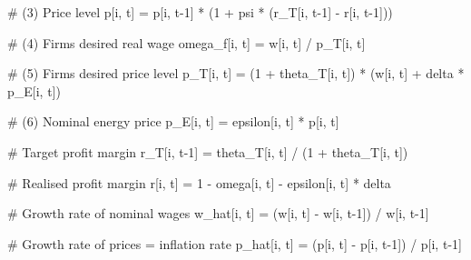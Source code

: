 \documentclass[
  letterpaper,
  DIV=11,
  numbers=noendperiod]{scrreprt}
\newenvironment{Shaded}{\begin{snugshade}}{\end{snugshade}}
\newcommand{\CommentTok}[1]{\textcolor[rgb]{0.37,0.37,0.37}{#1}}
\newcommand{\DecValTok}[1]{\textcolor[rgb]{0.68,0.00,0.00}{#1}}
\newcommand{\NormalTok}[1]{\textcolor[rgb]{0.00,0.23,0.31}{#1}}
\newcommand{\OperatorTok}[1]{\textcolor[rgb]{0.37,0.37,0.37}{#1}}
\begin{document}
\begin{tcolorbox}
\begin{Shaded}
\begin{Highlighting}[]
            \CommentTok{\# (3) Price level}
\NormalTok{            p[i, t] }\OperatorTok{=}\NormalTok{ p[i, t}\OperatorTok{{-}}\DecValTok{1}\NormalTok{] }\OperatorTok{*}\NormalTok{ (}\DecValTok{1} \OperatorTok{+}\NormalTok{ psi }\OperatorTok{*}\NormalTok{ (r\_T[i, t}\OperatorTok{{-}}\DecValTok{1}\NormalTok{] }\OperatorTok{{-}}\NormalTok{ r[i, t}\OperatorTok{{-}}\DecValTok{1}\NormalTok{]))}
            
            \CommentTok{\# (4) Firms\textquotesingle{} desired real wage}
\NormalTok{            omega\_f[i, t] }\OperatorTok{=}\NormalTok{ w[i, t] }\OperatorTok{/}\NormalTok{ p\_T[i, t]}
            
            \CommentTok{\# (5) Firms\textquotesingle{} desired price level}
\NormalTok{            p\_T[i, t] }\OperatorTok{=}\NormalTok{ (}\DecValTok{1} \OperatorTok{+}\NormalTok{ theta\_T[i, t]) }\OperatorTok{*}\NormalTok{ (w[i, t] }\OperatorTok{+}\NormalTok{ delta }\OperatorTok{*}\NormalTok{ p\_E[i, t])}
            
            \CommentTok{\# (6) Nominal energy price}
\NormalTok{            p\_E[i, t] }\OperatorTok{=}\NormalTok{ epsilon[i, t] }\OperatorTok{*}\NormalTok{ p[i, t]}
            
            \CommentTok{\# Target profit margin}
\NormalTok{            r\_T[i, t}\OperatorTok{{-}}\DecValTok{1}\NormalTok{] }\OperatorTok{=}\NormalTok{ theta\_T[i, t] }\OperatorTok{/}\NormalTok{ (}\DecValTok{1} \OperatorTok{+}\NormalTok{ theta\_T[i, t])}
            
            \CommentTok{\# Realised profit margin}
\NormalTok{            r[i, t] }\OperatorTok{=} \DecValTok{1} \OperatorTok{{-}}\NormalTok{ omega[i, t] }\OperatorTok{{-}}\NormalTok{ epsilon[i, t] }\OperatorTok{*}\NormalTok{ delta}
            
            \CommentTok{\# Growth rate of nominal wages}
\NormalTok{            w\_hat[i, t] }\OperatorTok{=}\NormalTok{ (w[i, t] }\OperatorTok{{-}}\NormalTok{ w[i, t}\OperatorTok{{-}}\DecValTok{1}\NormalTok{]) }\OperatorTok{/}\NormalTok{ w[i, t}\OperatorTok{{-}}\DecValTok{1}\NormalTok{]}
            
            \CommentTok{\# Growth rate of prices = inflation rate}
\NormalTok{            p\_hat[i, t] }\OperatorTok{=}\NormalTok{ (p[i, t] }\OperatorTok{{-}}\NormalTok{ p[i, t}\OperatorTok{{-}}\DecValTok{1}\NormalTok{]) }\OperatorTok{/}\NormalTok{ p[i, t}\OperatorTok{{-}}\DecValTok{1}\NormalTok{]}
            
\end{Highlighting}
\end{Shaded}

\end{tcolorbox}
\end{document}
